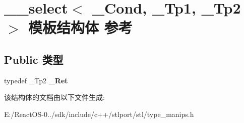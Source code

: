 \hypertarget{struct____select}{}\section{\+\_\+\+\_\+select$<$ \+\_\+\+Cond, \+\_\+\+Tp1, \+\_\+\+Tp2 $>$ 模板结构体 参考}
\label{struct____select}
\subsection*{Public 类型}
\begin{DoxyCompactItemize}
\item 
\mbox{\label{struct____select_a5eb9be4edb24acabe8474221fa4980ae}} 
typedef \+\_\+\+Tp2 {\bfseries \+\_\+\+Ret}
\end{DoxyCompactItemize}


该结构体的文档由以下文件生成\+:\begin{DoxyCompactItemize}
\item 
E\+:/\+React\+O\+S-\/0../sdk/include/c++/stlport/stl/type\+\_\+manips.\+h\end{DoxyCompactItemize}
